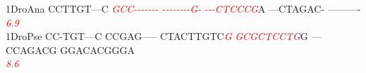 \documentclass[11pt,twoside,reqno,a4paper]{article}
\begin{document}
{1\hspace*{3\charwidth}DroAna	CCTTGT---C	\textit{\textcolor{Red}{G}}\textit{\textcolor{Red}{C}}\textit{\textcolor{Red}{C}}\textit{\textcolor{Red}{-}}\textit{\textcolor{Red}{-}}\textit{\textcolor{Red}{-}}\textit{\textcolor{Red}{-}}\textit{\textcolor{Red}{-}}\textit{\textcolor{Red}{-}}\textit{\textcolor{Red}{-}}	\textit{\textcolor{Red}{-}}\textit{\textcolor{Red}{-}}\textit{\textcolor{Red}{-}}\textit{\textcolor{Red}{-}}\textit{\textcolor{Red}{-}}\textit{\textcolor{Red}{-}}\textit{\textcolor{Red}{-}}\textit{\textcolor{Red}{-}}\textit{\textcolor{Red}{G}}\textit{\textcolor{Red}{-}}	\textit{\textcolor{Red}{-}}\textit{\textcolor{Red}{-}}\textit{\textcolor{Red}{-}}\textit{\textcolor{Red}{C}}\textit{\textcolor{Red}{T}}\textit{\textcolor{Red}{C}}\textit{\textcolor{Red}{C}}\textit{\textcolor{Red}{C}}\textit{\textcolor{Red}{G}}A	---CTAGAC-	----------	\\
\hspace*{4\charwidth}\hspace*{7\charwidth}\hspace*{1\charwidth}\hspace*{10\charwidth}\textit{\textcolor{Red}{6.9}}\hspace*{1\charwidth}\hspace*{1\charwidth}\hspace*{1\charwidth}\hspace*{1\charwidth}\hspace*{1\charwidth}\\
1\hspace*{3\charwidth}DroPse	CC-TGT---C	CCGAG-----	CTACTTGTC\textit{\textcolor{Red}{G}}	\textit{\textcolor{Red}{G}}\textit{\textcolor{Red}{C}}\textit{\textcolor{Red}{G}}\textit{\textcolor{Red}{C}}\textit{\textcolor{Red}{T}}\textit{\textcolor{Red}{C}}\textit{\textcolor{Red}{C}}\textit{\textcolor{Red}{T}}\textit{\textcolor{Red}{G}}G	---CCAGACG	GGACACGGGA	\\
\hspace*{4\charwidth}\hspace*{7\charwidth}\hspace*{1\charwidth}\hspace*{1\charwidth}\hspace*{29\charwidth}\textit{\textcolor{Red}{8.6}}\hspace*{1\charwidth}\hspace*{1\charwidth}\hspace*{1\charwidth}\hspace*{1\charwidth}\\
}
\end{document}
